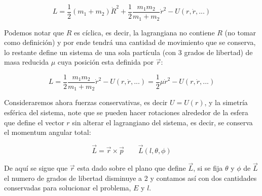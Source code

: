 	\[
	L=\frac{1}{2}(m_1+m_2)\dot{R}^{2}+\frac{1}{2}\frac{m_1m_2}{m_1+m_2}\dot{r}^2-U(r,\dot{r},...)
	\]
	
	Podemos notar que $R$ es cíclica, es decir, la lagrangiana no contiene $R$ (no tomar como definición) y por ende tendrá una cantidad de movimiento que se conserva, lo restante define un sistema de una sola partícula (con 3 grados de libertad) de masa reducida $\mu$ cuya posición esta definida por $\vec{r}$:
	
	\[
	L=\frac{1}{2}\frac{m_1m_2}{m_1+m_2}\dot{r}^2-U(r,\dot{r},...)=\frac{1}{2}\mu\dot{r}^2-U(r,\dot{r},...)
	\]
	
	Consideraremos ahora fuerzas conservativas, es decir $U=U(r)$, y la simetría esférica del sistema, note que se pueden hacer rotaciones alrededor de la esfera que define el vector $r$ sin alterar el lagrangiano del sistema, es decir, se conserva el momentum angular total:
	
	\[
	\vec{L}=\vec{r}\times\vec{p}\quad\quad \vec{L}(l,\theta,\phi)
	\]
	
	De aquí se sigue que $\vec{r}$ esta dado sobre el plano que define $\vec{L}$, si se fija $\theta$ y $\phi$ de $\vec{L}$ el numero de grados de libertad disminuye a 2 y contamos así con dos cantidades conservadas para solucionar el problema, $E$ y $l$.
